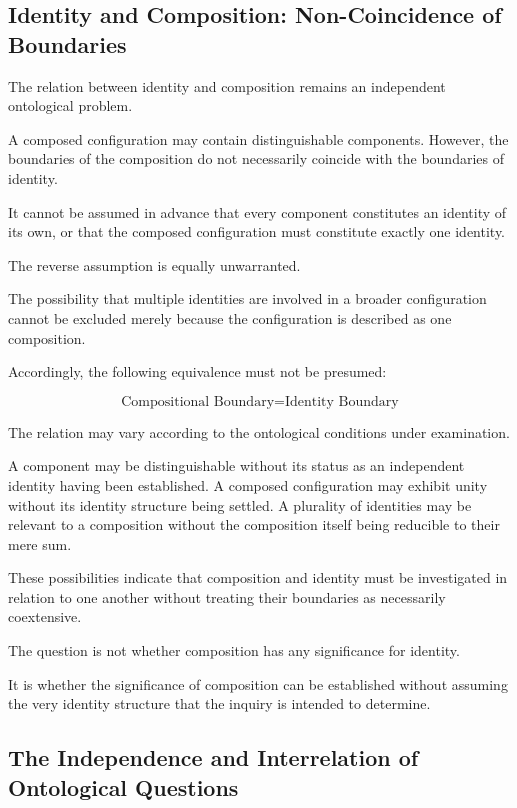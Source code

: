 \subsection{Identity and Composition: Non-Coincidence of Boundaries}

The relation between identity
and composition remains an
independent ontological problem.

A composed configuration may
contain distinguishable components.
However, the boundaries of
the composition do not necessarily
coincide with the boundaries
of identity.

It cannot be assumed in advance
that every component constitutes
an identity of its own, or that
the composed configuration must
constitute exactly one identity.

The reverse assumption is equally
unwarranted.

The possibility that multiple
identities are involved in a
broader configuration cannot
be excluded merely because
the configuration is described
as one composition.

Accordingly, the following
equivalence must not be presumed:

\[
\text{Compositional Boundary}
=
\text{Identity Boundary}
\]

The relation may vary according
to the ontological conditions
under examination.

A component may be distinguishable
without its status as an independent
identity having been established.
A composed configuration may
exhibit unity without its identity
structure being settled.
A plurality of identities may
be relevant to a composition
without the composition itself
being reducible to their mere sum.

These possibilities indicate
that composition and identity
must be investigated in relation
to one another without treating
their boundaries as necessarily
coextensive.

The question is not whether
composition has any significance
for identity.

It is whether the significance
of composition can be established
without assuming the very identity
structure that the inquiry is
intended to determine.

\subsection{The Independence and Interrelation of Ontological Questions}

